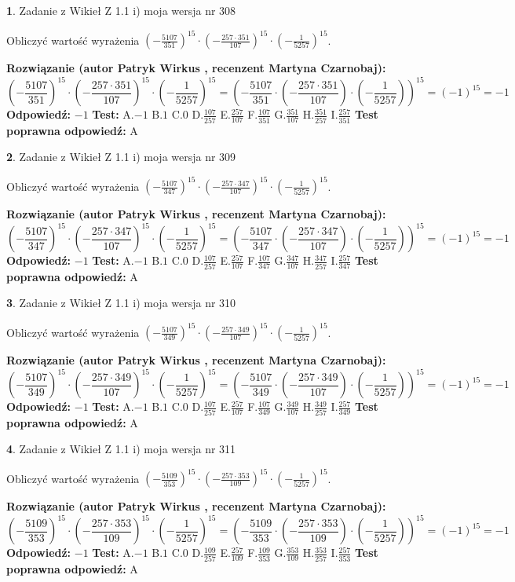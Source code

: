 \documentclass[12pt, a4paper]{article}
\theoremstyle{definition} %
\newtheorem{zad}{}
\newcommand{\zadStart}[1]{\begin{zad}#1\newline}
\newcommand{\zadStop}{\end{zad}}
\newcommand{\rozwStart}[2]{\noindent \textbf{Rozwiązanie (autor #1 , recenzent #2): }\newline}
\newcommand{\rozwStop}{\newline}
\newcommand{\odpStart}{\noindent \textbf{Odpowiedź:}\newline}
\newcommand{\odpStop}{\newline}
\newcommand{\testStart}{\noindent \textbf{Test:}\newline}
\newcommand{\testStop}{\newline}
\newcommand{\kluczStart}{\noindent \textbf{Test poprawna odpowiedź:}\newline}
\newcommand{\kluczStop}{\newline}
\begin{document}
\zadStart{Zadanie z Wikieł Z 1.1 i) moja wersja nr 308}

Obliczyć wartość wyrażenia $(-\frac{5107}{351})^{15} \cdot (-\frac{257 \cdot 351}{107})^{15} \cdot (-\frac{1}{5257})^{15}$.
\zadStop
\rozwStart{Patryk Wirkus}{Martyna Czarnobaj}
$$(-\frac{5107}{351})^{15} \cdot (-\frac{257 \cdot 351}{107})^{15} \cdot (-\frac{1}{5257})^{15} = (-\frac{5107}{351} \cdot (-\frac{257 \cdot 351}{107}) \cdot (-\frac{1}{5257}))^{15} = (-1)^{15} = -1$$
\rozwStop
\odpStart
$-1$
\odpStop
\testStart
A.$-1$ B.$1$ C.$0$ D.$\frac{107}{257}$ E.$\frac{257}{107}$
F.$\frac{107}{351}$ G.$\frac{351}{107}$
H.$\frac{351}{257}$
I.$\frac{257}{351}$
\testStop
\kluczStart
A
\kluczStop



\zadStart{Zadanie z Wikieł Z 1.1 i) moja wersja nr 309}

Obliczyć wartość wyrażenia $(-\frac{5107}{347})^{15} \cdot (-\frac{257 \cdot 347}{107})^{15} \cdot (-\frac{1}{5257})^{15}$.
\zadStop
\rozwStart{Patryk Wirkus}{Martyna Czarnobaj}
$$(-\frac{5107}{347})^{15} \cdot (-\frac{257 \cdot 347}{107})^{15} \cdot (-\frac{1}{5257})^{15} = (-\frac{5107}{347} \cdot (-\frac{257 \cdot 347}{107}) \cdot (-\frac{1}{5257}))^{15} = (-1)^{15} = -1$$
\rozwStop
\odpStart
$-1$
\odpStop
\testStart
A.$-1$ B.$1$ C.$0$ D.$\frac{107}{257}$ E.$\frac{257}{107}$
F.$\frac{107}{347}$ G.$\frac{347}{107}$
H.$\frac{347}{257}$
I.$\frac{257}{347}$
\testStop
\kluczStart
A
\kluczStop



\zadStart{Zadanie z Wikieł Z 1.1 i) moja wersja nr 310}

Obliczyć wartość wyrażenia $(-\frac{5107}{349})^{15} \cdot (-\frac{257 \cdot 349}{107})^{15} \cdot (-\frac{1}{5257})^{15}$.
\zadStop
\rozwStart{Patryk Wirkus}{Martyna Czarnobaj}
$$(-\frac{5107}{349})^{15} \cdot (-\frac{257 \cdot 349}{107})^{15} \cdot (-\frac{1}{5257})^{15} = (-\frac{5107}{349} \cdot (-\frac{257 \cdot 349}{107}) \cdot (-\frac{1}{5257}))^{15} = (-1)^{15} = -1$$
\rozwStop
\odpStart
$-1$
\odpStop
\testStart
A.$-1$ B.$1$ C.$0$ D.$\frac{107}{257}$ E.$\frac{257}{107}$
F.$\frac{107}{349}$ G.$\frac{349}{107}$
H.$\frac{349}{257}$
I.$\frac{257}{349}$
\testStop
\kluczStart
A
\kluczStop



\zadStart{Zadanie z Wikieł Z 1.1 i) moja wersja nr 311}

Obliczyć wartość wyrażenia $(-\frac{5109}{353})^{15} \cdot (-\frac{257 \cdot 353}{109})^{15} \cdot (-\frac{1}{5257})^{15}$.
\zadStop
\rozwStart{Patryk Wirkus}{Martyna Czarnobaj}
$$(-\frac{5109}{353})^{15} \cdot (-\frac{257 \cdot 353}{109})^{15} \cdot (-\frac{1}{5257})^{15} = (-\frac{5109}{353} \cdot (-\frac{257 \cdot 353}{109}) \cdot (-\frac{1}{5257}))^{15} = (-1)^{15} = -1$$
\rozwStop
\odpStart
$-1$
\odpStop
\testStart
A.$-1$ B.$1$ C.$0$ D.$\frac{109}{257}$ E.$\frac{257}{109}$
F.$\frac{109}{353}$ G.$\frac{353}{109}$
H.$\frac{353}{257}$
I.$\frac{257}{353}$
\testStop
\kluczStart
A
\kluczStop
\end{document}
